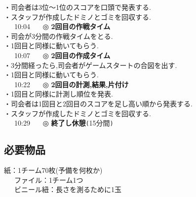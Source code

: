 \documentclass[a4j]{jarticle}
\begin{document}
\hspace{15mm}・司会者は3位〜1位のスコアを口頭で発表する.\\
\hspace{15mm}・スタッフが作成したドミノとゴミを回収する.\\
\ \ \ 10:04 \ \ \ ◎ \textbf{2回目の作戦タイム}\\
\hspace{15mm}・司会が3分間の作戦タイムをとる.\\
\hspace{15mm}・1回目と同様に動いてもらう.\\
\ \ \ 10:07 \ \ \ ◎ \textbf{2回目の作成タイム}\\
\hspace{15mm}・3分間経ったら,司会者がゲームスタートの合図を出す.\\
\hspace{15mm}・1回目と同様に動いてもらう.\\
\ \ \ 10:22 \ \ \ ◎ \textbf{2回目の計測,結果,片付け}\\
\hspace{15mm}・1回目と同様に計測し順位を発表.\\
\hspace{15mm}・司会者は1回目と2回目のスコアを足し高い順から発表する.\\
\hspace{15mm}・スタッフが作成したドミノとゴミを回収する.\\
\ \ \ 10:29 \ \ \ ◎ \textbf{終了し休憩}\verb+(+15分間\verb+)+

\subsection{必要物品}
紙：1チーム70枚(予備を何枚か)\\
\ \ \ ファイル：1チーム1つ\\
\ \ \ ビニール紐：長さを測るために1玉
\end{document}
